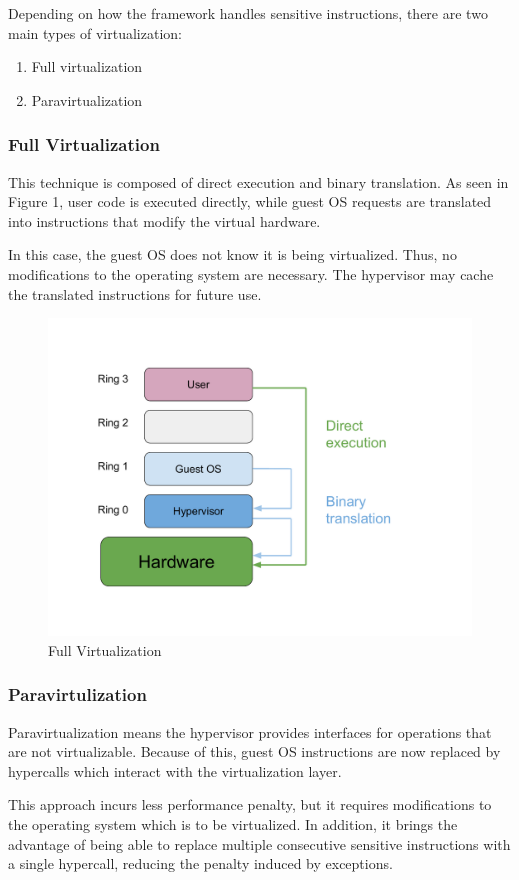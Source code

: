 Depending on how the framework handles sensitive instructions, there are two main types of virtualization\cite{vmware}:
\begin{enumerate}
\item
Full virtualization
\item
Paravirtualization
\end{enumerate}

\subsubsection{Full Virtualization}
\label{subsubsec:fullvirt}

This technique is composed of direct execution and binary translation.
As seen in Figure 1, user code is executed directly, while guest OS requests are translated into instructions that modify the virtual hardware.

In this case, the guest OS does not know it is being virtualized. Thus, no modifications to the operating system are necessary. The hypervisor may cache the translated instructions for future use.

\begin{figure}[h!]
\centering
  \includegraphics[width=.55\linewidth]{img/fullvirt.pdf}
  \caption{Full Virtualization}
\end{figure}

\subsubsection{Paravirtulization}
\label{subsubsec:paravirt}

Paravirtualization means the hypervisor provides interfaces for operations that are not virtualizable. Because of this, guest OS instructions are now replaced by hypercalls which interact with the virtualization layer.

This approach incurs less performance penalty, but it requires modifications to the operating system which is to be virtualized. In addition, it brings the advantage of being able to replace multiple consecutive sensitive instructions with a single hypercall, reducing the penalty induced by exceptions\cite{virt-embedded}.

